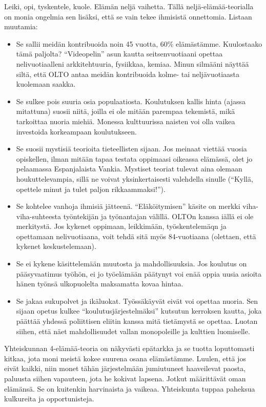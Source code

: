 Leiki, opi, tyskentele, kuole. Elämän neljä vaihetta. Tällä neljä-elämää-teorialla on monia ongelmia sen lisäksi, että se vain tekee ihmisistä onnettomia. Listaan muutamia:
\begin{itemize}
\item Se sallii meidän kontribuoida noin 45 vuotta, 60\% elämästämme. Kuulostaako tämä paljolta? ``Videopelin'' asun kautta seitsenvuotiaani opettaa nelivuotiaalleni arkkitehtuuria, fysiikkaa, kemiaa. Minun silmääni näyttää siltä, että OLTO antaa meidän kontribuoida kolme- tai neljävuotiaasta kuolemaan saakka.
\item Se sulkee pois suuria osia populaatiosta. Koulutuksen kallis hinta (ajassa mitattuna) suosii niitä, joilla ei ole mitään parempaa tekemistä, mikä tarkoittaa nuoria miehiä. Monessa kulttuurissa naisten voi olla vaikea investoida korkeampaan koulutukseen.
\item Se suosii mystisiä teorioita tieteellisten sijaan. Jos meinaat viettää vuosia opiskellen, ilman mitään tapaa testata oppimaasi oikeassa elämässä, olet jo pelaamassa Espanjalaista Vankia. Mystiset teoriat tulevat aina olemaan houkuttelevampia, sillä ne voivat yksinkertaisesti valehdella sinulle (``Kyllä, opettele minut ja tulet paljon rikkaammaksi!'').
\item Se kohtelee vanhoja ihmisiä jätteenä. ``Eläköitymisen'' käsite on merkki viha-viha-suhteesta työntekijän ja työnantajan välillä. OLTOn kanssa iällä ei ole merkitystä. Jos kykenet oppimaan, leikkimään, työskentelemäqn ja opettamaan nelivuotiaana, voit tehdä sitä myös 84-vuotiaana (olettaen, että kykenet keskustelemaan).
\item Se ei kykene käsittelemään muutosta ja mahdollisuuksia. Jos koulutus on pääsyvaatimus työhön, ei jo työelämään päätynyt voi enää oppia uusia asioita hänen työnsä ulkopuolelta maksamatta kovaa hintaa.
\item Se jakaa sukupolvet ja ikäluokat. Työssäkäyvät eivät voi opettaa nuoria. Sen sijaan opetus kulkee ``koulutusjärjestelmäksi'' kutsutun kerroksen kautta, joka päättää yhdessä poliittisen eliitin kanssa mitä tietämystä se opettaa. Luotan siihen, että näet mahdollisuudet vallan monopoleille ja kulttien luomiselle.
\end{itemize}
Yhteiskunnan 4-elämää-teoria on näkyvästi epätarkka ja se tuotta loputtomasti kitkaa, jota moni meistä kokee suurena osana elämästämme. Luulen, että jos eivät kaikki, niin monet tähän järjestelmään jumiutuneet haaveilevat paosta, paluusta siihen vapauteen, jota he kokivat lapsena. Jotkut määrittävät oman elämänsä. Se on kuitenkin harvinaista ja vaikeaa. Yhteiskunta tuppaa paheksua kulkureita ja opportunisteja.

